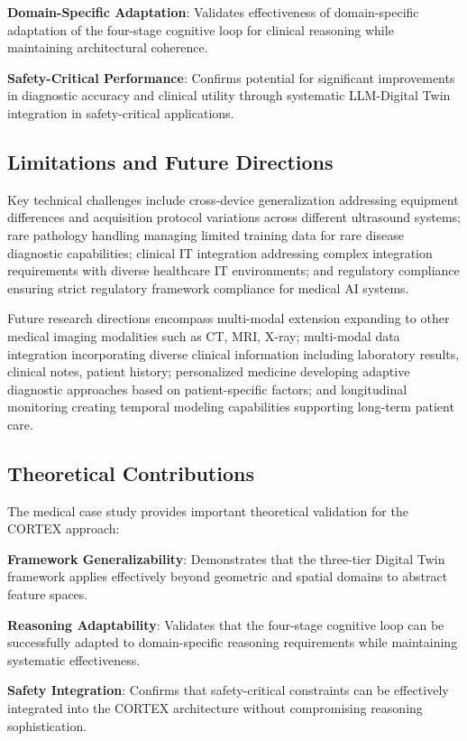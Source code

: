 \textbf{Domain-Specific Adaptation}: Validates effectiveness of domain-specific adaptation of the four-stage cognitive loop for clinical reasoning while maintaining architectural coherence.

\textbf{Safety-Critical Performance}: Confirms potential for significant improvements in diagnostic accuracy and clinical utility through systematic LLM-Digital Twin integration in safety-critical applications.

\subsection{Limitations and Future Directions}

Key technical challenges include cross-device generalization addressing equipment differences and acquisition protocol variations across different ultrasound systems; rare pathology handling managing limited training data for rare disease diagnostic capabilities; clinical IT integration addressing complex integration requirements with diverse healthcare IT environments; and regulatory compliance ensuring strict regulatory framework compliance for medical AI systems.

Future research directions encompass multi-modal extension expanding to other medical imaging modalities such as CT, MRI, X-ray; multi-modal data integration incorporating diverse clinical information including laboratory results, clinical notes, patient history; personalized medicine developing adaptive diagnostic approaches based on patient-specific factors; and longitudinal monitoring creating temporal modeling capabilities supporting long-term patient care.

\subsection{Theoretical Contributions}

The medical case study provides important theoretical validation for the CORTEX approach:

\textbf{Framework Generalizability}: Demonstrates that the three-tier Digital Twin framework applies effectively beyond geometric and spatial domains to abstract feature spaces.

\textbf{Reasoning Adaptability}: Validates that the four-stage cognitive loop can be successfully adapted to domain-specific reasoning requirements while maintaining systematic effectiveness.

\textbf{Safety Integration}: Confirms that safety-critical constraints can be effectively integrated into the CORTEX architecture without compromising reasoning sophistication.

